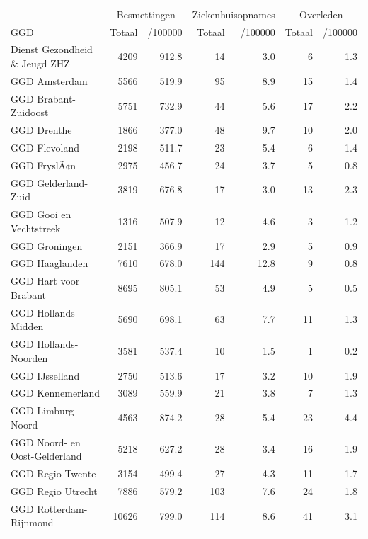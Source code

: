 \documentclass[
  english,
  man,floatsintext]{apa6}
\begin{document}
\begin{table}
\centering\begingroup\fontsize{10}{12}\selectfont

\begin{threeparttable}
\begin{tabular}{lrrrrrr}
\toprule
\multicolumn{1}{c}{ } & \multicolumn{2}{c}{Besmettingen} & \multicolumn{2}{c}{Ziekenhuisopnames} & \multicolumn{2}{c}{Overleden} \\
\cmidrule(l{3pt}r{3pt}){2-3} \cmidrule(l{3pt}r{3pt}){4-5} \cmidrule(l{3pt}r{3pt}){6-7}
GGD & Totaal & /100000 & Totaal & /100000 & Totaal & /100000\\
\midrule
Dienst Gezondheid \& Jeugd ZHZ & 4209 & 912.8 & 14 & 3.0 & 6 & 1.3\\
GGD Amsterdam & 5566 & 519.9 & 95 & 8.9 & 15 & 1.4\\
GGD Brabant-Zuidoost & 5751 & 732.9 & 44 & 5.6 & 17 & 2.2\\
GGD Drenthe & 1866 & 377.0 & 48 & 9.7 & 10 & 2.0\\
GGD Flevoland & 2198 & 511.7 & 23 & 5.4 & 6 & 1.4\\
GGD FryslÃ¢n & 2975 & 456.7 & 24 & 3.7 & 5 & 0.8\\
GGD Gelderland-Zuid & 3819 & 676.8 & 17 & 3.0 & 13 & 2.3\\
GGD Gooi en Vechtstreek & 1316 & 507.9 & 12 & 4.6 & 3 & 1.2\\
GGD Groningen & 2151 & 366.9 & 17 & 2.9 & 5 & 0.9\\
GGD Haaglanden & 7610 & 678.0 & 144 & 12.8 & 9 & 0.8\\
GGD Hart voor Brabant & 8695 & 805.1 & 53 & 4.9 & 5 & 0.5\\
GGD Hollands-Midden & 5690 & 698.1 & 63 & 7.7 & 11 & 1.3\\
GGD Hollands-Noorden & 3581 & 537.4 & 10 & 1.5 & 1 & 0.2\\
GGD IJsselland & 2750 & 513.6 & 17 & 3.2 & 10 & 1.9\\
GGD Kennemerland & 3089 & 559.9 & 21 & 3.8 & 7 & 1.3\\
GGD Limburg-Noord & 4563 & 874.2 & 28 & 5.4 & 23 & 4.4\\
GGD Noord- en Oost-Gelderland & 5218 & 627.2 & 28 & 3.4 & 16 & 1.9\\
GGD Regio Twente & 3154 & 499.4 & 27 & 4.3 & 11 & 1.7\\
GGD Regio Utrecht & 7886 & 579.2 & 103 & 7.6 & 24 & 1.8\\
GGD Rotterdam-Rijnmond & 10626 & 799.0 & 114 & 8.6 & 41 & 3.1\\

\end{tabular}
\end{threeparttable}
\end{table}
\end{document}
